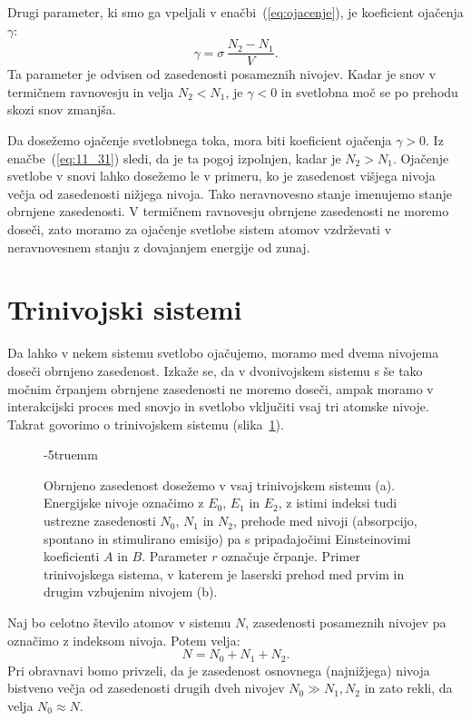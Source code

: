 Drugi parameter, ki smo ga vpeljali v enačbi~(\ref{eq:ojacenje}), 
je koeficient ojačenja $\gamma$:
\begin{equation}
\gamma = \sigma \,\frac{N_2-N_1}{V}.
\label{eq:11_31}
\end{equation}
Ta parameter je odvisen od zasedenosti posameznih  nivojev. 
Kadar je snov v termičnem ravnovesju in velja $N_2 < N_1$, je $\gamma <0$
in svetlobna moč se po prehodu skozi snov zmanjša. 

Da dosežemo
ojačenje svetlobnega toka, mora biti koeficient ojačenja $\gamma >0$. 
Iz enačbe~(\ref{eq:11_31}) sledi, da je ta pogoj izpolnjen, kadar je $N_2>N_1$.
Ojačenje svetlobe v snovi lahko dosežemo le v primeru, ko je zasedenost
višjega nivoja večja od zasedenosti nižjega nivoja. Tako neravnovesno 
stanje imenujemo stanje obrnjene zasedenosti. V termičnem ravnovesju
obrnjene zasedenosti ne moremo doseči, zato moramo za ojačenje svetlobe
sistem atomov vzdrževati v neravnovesnem stanju z dovajanjem energije od zunaj.

\section{Trinivojski sistemi}
Da lahko v nekem sistemu svetlobo ojačujemo, moramo med 
dvema nivojema doseči obrnjeno zasedenost. Izkaže se, da v dvonivojskem 
sistemu s še tako močnim črpanjem obrnjene zasedenosti ne moremo doseči, 
ampak moramo v interakcijski proces med snovjo in svetlobo vključiti 
vsaj tri atomske nivoje. Takrat govorimo o trinivojskem sistemu 
(slika~\ref{fig:11_3nivojski}).
\begin{figure}[ht!]
\centering
\def\svgwidth{100truemm} 

\caption{Obrnjeno zasedenost dosežemo v vsaj trinivojskem sistemu (a). Energijske
nivoje označimo z $E_0$, $E_1$ in $E_2$, z istimi indeksi tudi ustrezne 
zasedenosti $N_0$, $N_1$ in $N_2$, 
prehode med nivoji (absorpcijo, spontano in stimulirano emisijo) pa s pripadajočimi
Einsteinovimi koeficienti $A$ in $B$. Parameter $r$ označuje črpanje. Primer
trinivojskega sistema, v katerem je laserski prehod med prvim in drugim vzbujenim
nivojem (b).
}
\vglue-5truemm
\label{fig:11_3nivojski}
\end{figure}

Naj bo celotno število atomov v sistemu $N$, zasedenosti posameznih nivojev pa 
označimo z indeksom nivoja. Potem velja:
\begin{equation}
N = N_0 + N_1 + N_2.
\label{eq:11_32}
\end{equation}
Pri obravnavi bomo privzeli, da je zasedenost osnovnega (najnižjega) 
nivoja bistveno večja od zasedenosti drugih dveh nivojev $N_0 \gg N_1, N_2$ 
in zato rekli, da velja $N_0 \approx N$. 

